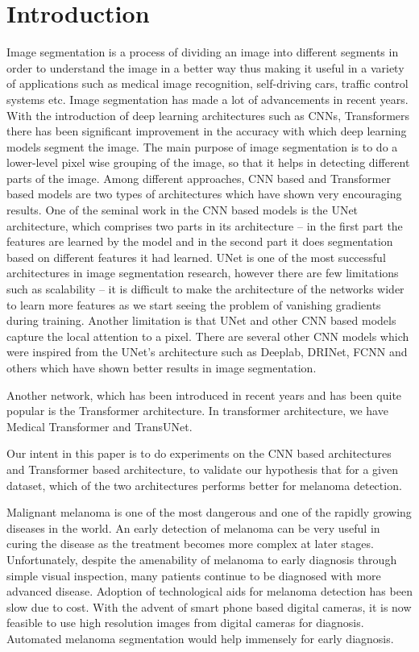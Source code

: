 \section{Introduction}

Image segmentation is a process of dividing an image into different segments in order to understand the image in a better way thus making it useful in a variety of applications such as medical image recognition, self-driving cars, traffic control systems etc. Image segmentation has made a lot of advancements in recent years. With the introduction of deep learning architectures such as CNNs, Transformers there has been significant improvement in the accuracy with which deep learning models segment the image. The main purpose of image segmentation is to do a lower-level pixel wise grouping of the image, so that it helps in detecting different parts of the image. Among different approaches, CNN based and Transformer based models are two types of architectures which have shown very encouraging results. One of the seminal work in the CNN based models is the UNet architecture, which comprises two parts in its architecture – in the first part the features are learned by the model and in the second part it does segmentation based on different features it had learned. UNet is one of the most successful architectures in image segmentation research, however there are few limitations such as  scalability – it is difficult to make the architecture of the networks wider to learn more features as we start seeing the problem of vanishing gradients during training. Another limitation is that UNet and other CNN based models capture the local attention to a pixel. There are several other CNN models which were inspired from the UNet’s architecture such as Deeplab, DRINet, FCNN and others which have shown better results in image segmentation.

\par
Another network, which has been introduced in recent years and has been quite popular is the Transformer architecture. In transformer architecture, we have Medical Transformer and TransUNet.

\par
Our intent in this paper is to do experiments on the CNN based architectures and Transformer based architecture, to validate our hypothesis that for a given dataset, which of the two architectures performs better for melanoma detection.

\par
Malignant melanoma is one of the most dangerous and one of the rapidly growing diseases in the world. An early detection of melanoma can be very useful in curing the disease as the treatment becomes more complex at later stages. Unfortunately, despite the amenability of melanoma to early diagnosis through simple visual inspection, many patients continue to be diagnosed with more advanced disease. Adoption of technological aids for melanoma detection has been slow due to cost. With the advent of smart phone based digital cameras, it is now feasible to use high resolution images from digital cameras for diagnosis. Automated melanoma segmentation would help immensely for early diagnosis.


